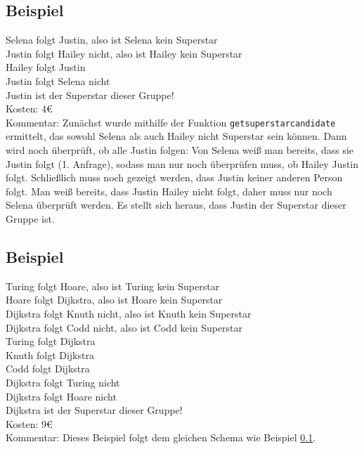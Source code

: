 \documentclass[a4paper,10pt,ngerman]{scrartcl}
\begin{document}
\subsection{Beispiel}
\label{bspjustin}
\noindent Selena folgt Justin, also ist Selena kein Superstar\\
Justin folgt Hailey nicht, also ist Hailey kein Superstar\\ 
Hailey folgt Justin                          \\
Justin folgt Selena nicht                    \\
Justin ist der Superstar dieser Gruppe!      \\
Kosten: 4\euro{}\\
Kommentar: Zunächst wurde mithilfe der Funktion \lstinline|getsuperstarcandidate| ermittelt, das sowohl Selena als auch Hailey nicht Superstar sein können. Dann wird noch überprüft, ob alle Justin folgen: Von Selena weiß man bereits, dass sie Justin folgt (1. Anfrage), sodass man nur noch überprüfen muss, ob Hailey Justin folgt.
Schließlich muss noch gezeigt werden, dass Justin keiner anderen Person folgt. Man weiß bereits, dass Justin Hailey nicht folgt, daher muss nur noch Selena überprüft werden. 
Es stellt sich heraus, dass Justin der Superstar dieser Gruppe ist.
\subsection{Beispiel}
\noindent Turing folgt Hoare, also ist Turing kein Superstar \\
Hoare folgt Dijkstra, also ist Hoare kein Superstar\\
Dijkstra folgt Knuth nicht, also ist Knuth kein Superstar  \\
Dijkstra folgt Codd nicht, also ist Codd kein Superstar\\    
Turing folgt Dijkstra  \\
Knuth folgt Dijkstra \\
Codd folgt Dijkstra \\
Dijkstra folgt Turing nicht\\
Dijkstra folgt Hoare nicht   \\                              
Dijkstra ist der Superstar dieser Gruppe! \\                 
Kosten: 9\euro{}\\
Kommentar: Dieses Beispiel folgt dem gleichen Schema wie Beispiel \ref{bspjustin}.
\end{document}
